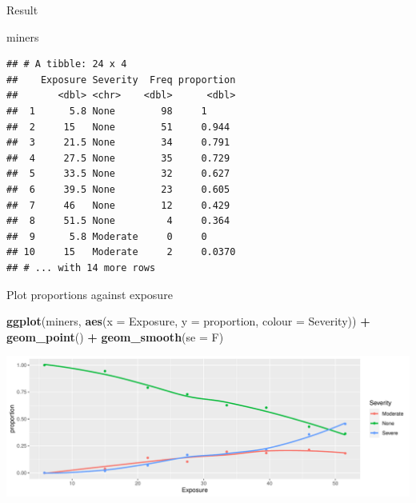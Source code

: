 \documentclass[
  ignorenonframetext,
]{beamer}
\newenvironment{Shaded}{\begin{snugshade}}{\end{snugshade}}
\newcommand{\DataTypeTok}[1]{\textcolor[rgb]{0.13,0.29,0.53}{#1}}
\newcommand{\KeywordTok}[1]{\textcolor[rgb]{0.13,0.29,0.53}{\textbf{#1}}}
\newcommand{\NormalTok}[1]{#1}
\newcommand{\OperatorTok}[1]{\textcolor[rgb]{0.81,0.36,0.00}{\textbf{#1}}}
\newcommand{\StringTok}[1]{\textcolor[rgb]{0.31,0.60,0.02}{#1}}
\begin{document}
\begin{frame}[fragile]{Result}
\protect\hypertarget{result}{}

\small

\begin{Shaded}
\begin{Highlighting}[]
\NormalTok{miners}
\end{Highlighting}
\end{Shaded}

\begin{verbatim}
## # A tibble: 24 x 4
##    Exposure Severity  Freq proportion
##       <dbl> <chr>    <dbl>      <dbl>
##  1      5.8 None        98     1     
##  2     15   None        51     0.944 
##  3     21.5 None        34     0.791 
##  4     27.5 None        35     0.729 
##  5     33.5 None        32     0.627 
##  6     39.5 None        23     0.605 
##  7     46   None        12     0.429 
##  8     51.5 None         4     0.364 
##  9      5.8 Moderate     0     0     
## 10     15   Moderate     2     0.0370
## # ... with 14 more rows
\end{verbatim}

\normalsize

\end{frame}

\begin{frame}[fragile]{Plot proportions against exposure}
\protect\hypertarget{plot-proportions-against-exposure}{}

\small

\begin{Shaded}
\begin{Highlighting}[]
\KeywordTok{ggplot}\NormalTok{(miners, }\KeywordTok{aes}\NormalTok{(}\DataTypeTok{x =}\NormalTok{ Exposure, }\DataTypeTok{y =}\NormalTok{ proportion,}
                   \DataTypeTok{colour =}\NormalTok{ Severity)) }\OperatorTok{+}\StringTok{ }
\StringTok{  }\KeywordTok{geom_point}\NormalTok{() }\OperatorTok{+}\StringTok{ }\KeywordTok{geom_smooth}\NormalTok{(}\DataTypeTok{se =}\NormalTok{ F)}
\end{Highlighting}
\end{Shaded}

\includegraphics{slides_d29_files/figure-beamer/unnamed-chunk-109-1.pdf}
\normalsize

\end{frame}
\end{document}
